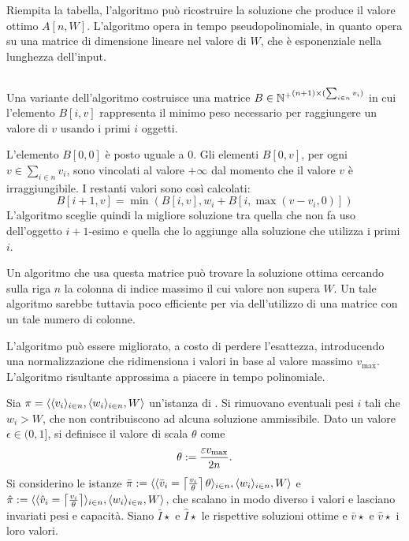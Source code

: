 Riempita la tabella, l'algoritmo può ricostruire la soluzione che produce il valore ottimo $A[n,W]$.
L'algoritmo opera in tempo pseudopolinomiale, in quanto opera su una matrice di dimensione lineare nel valore di $W$, che è esponenziale nella lunghezza dell'input.


\subsection{\WeightDynamicKnapsack}
Una variante dell'algoritmo \DynamicKnapsack costruisce una matrice $B\in{\N^+}^{(n+1)\times (\sum_{i\in n} v_i)}$ in cui l'elemento $B[i,v]$ rappresenta il minimo peso necessario per raggiungere un valore di $v$ usando i primi $i$ oggetti.

L'elemento $B[0,0]$ è posto uguale a $0$. Gli elementi $B[0,v]$, per ogni $v\in\sum_{i\in n} v_i$, sono vincolati al valore $+\infty$ dal momento che il valore $v$ è irraggiungibile. I restanti valori sono così calcolati:
\begin{equation*}
	B[i+1,v] = \min(B[i,v], w_i+B[i,\max(v-v_i,0)])
\end{equation*}
L'algoritmo sceglie quindi la migliore soluzione tra quella che non fa uso dell'oggetto $i+1$-esimo e quella che lo aggiunge alla soluzione che utilizza i primi $i$.

Un algoritmo che usa questa matrice può trovare la soluzione ottima cercando sulla riga $n$ la colonna di indice massimo il cui valore non supera $W$. Un tale algoritmo sarebbe tuttavia poco efficiente per via dell'utilizzo di una matrice con un tale numero di colonne.

L'algoritmo può essere migliorato, a costo di perdere l'esattezza, introducendo una normalizzazione che ridimensiona i valori in base al valore massimo $v_{\max}$.
L'algoritmo risultante approssima a piacere in tempo polinomiale.

Sia $\pi=\tuple{\angle{v_i}_{i\in n},\angle{w_i}_{i\in n},W}$ un'istanza di \Knapsack. Si rimuovano eventuali pesi $i$ tali che $w_i>W$, che non contribuiscono ad alcuna soluzione ammissibile.
Dato un valore $\epsilon\in(0,1]$, si definisce il valore di scala $\theta$ come
\begin{equation*}
	\theta:=\frac{\epsilon v_{\max}}{2n} \text.
\end{equation*}
Si considerino le istanze $\bar\pi:=\tuple{\angle{\bar v_i=\ceil{\frac{v_i}{\theta}}\theta}_{i\in n},\angle{w_i}_{i\in n},W}$ e $\hat\pi:=\tuple{\angle{\hat v_i=\ceil{\frac{v_i}{\theta}}}_{i\in n},\angle{w_i}_{i\in n},W}$, che scalano in modo diverso i valori e lasciano invariati pesi e capacità.
Siano $\bar I\star$ e $\hat I\star$ le rispettive soluzioni ottime e $\bar v\star$ e $\hat v\star$ i loro valori.

